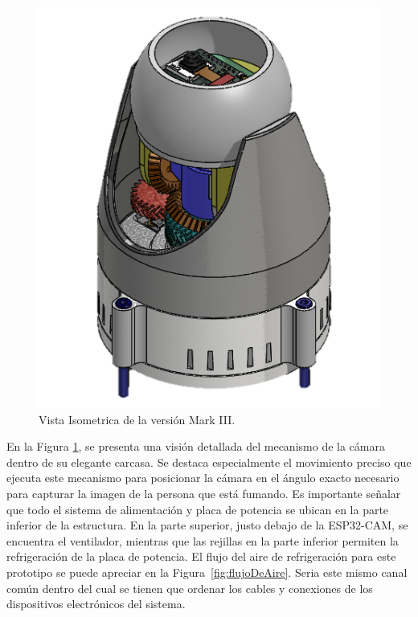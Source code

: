     \begin{figure}[H]
    \centering
    \begin{adjustbox}{width=\linewidth/3}
      \includegraphics{media/vista_isometrica.png}
    \end{adjustbox}
    \caption{\label{fig:Mark03} Vista Isometrica de la versión Mark III.}
    \end{figure}

    En la Figura \ref{fig:Mark03}, se presenta una visión detallada del mecanismo de la cámara dentro de su elegante carcasa. Se destaca especialmente el movimiento preciso que ejecuta este mecanismo para posicionar la cámara en el ángulo exacto necesario para capturar la imagen de la persona que está fumando. Es importante señalar que todo el sistema de alimentación y placa de potencia se ubican en la parte inferior de la estructura. En la parte superior, justo debajo de la ESP32-CAM, se encuentra el ventilador, mientras que las rejillas en la parte inferior permiten la refrigeración de la placa de potencia. El flujo del aire de refrigeración para este prototipo se puede apreciar en la Figura~\ref{fig:flujoDeAire}. Seria este mismo canal común dentro del cual se tienen que ordenar los cables y conexiones de los dispositivos electrónicos del sistema.

